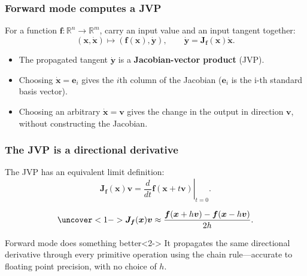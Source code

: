 \documentclass[]{article}
\begin{document}
\begin{frame}
\frametitle{Forward mode computes a JVP}

For a function $\bm{f}:\mathbb{R}^n\rightarrow\mathbb{R}^m$, carry an input value and an input tangent together:
\begin{equation*}
	(\bm{x},\dot{\bm{x}}) \longmapsto
	\left(\bm{f}(\bm{x}),\dot{\bm{y}}\right),
	\qquad
	\dot{\bm{y}} = \bm{J}_{\bm{f}}(\bm{x})\dot{\bm{x}}.
\end{equation*}

\begin{itemize}
	\item<2-> The propagated tangent $\dot{\bm{y}}$ is a \textbf{Jacobian-vector product} (JVP).
	\item<3-> Choosing $\dot{\bm{x}}=\bm{e}_i$ gives the $i$th column of the Jacobian ($\bm{e}_i$ is the i-th standard basis vector).
	\item<4-> Choosing an arbitrary $\dot{\bm{x}}=\bm{v}$ gives the change in the output in direction $\bm{v}$, without constructing the Jacobian.
\end{itemize}
\end{frame}


\begin{frame}
\frametitle{The JVP is a directional derivative}

The JVP has an equivalent limit definition:
\begin{equation*}
	\bm{J}_{\bm{f}}(\bm{x})\bm{v}
	=
	\left.\frac{d}{dt}\bm{f}(\bm{x}+t\bm{v})\right|_{t=0}.
\end{equation*}

\begin{equation*}
	\uncover<1->{\bm{J}_{\bm{f}}(\bm{x})\bm{v}
	\approx
	\frac{\bm{f}(\bm{x}+h\bm{v})-\bm{f}(\bm{x}-h\bm{v})}{2h}.}
\end{equation*}

\begin{block}{Forward mode does something better}<2->
	It propagates the same directional derivative through every primitive operation using the chain rule---accurate to floating point precision, with no choice of $h$.
\end{block}
\end{frame}
\end{document}
